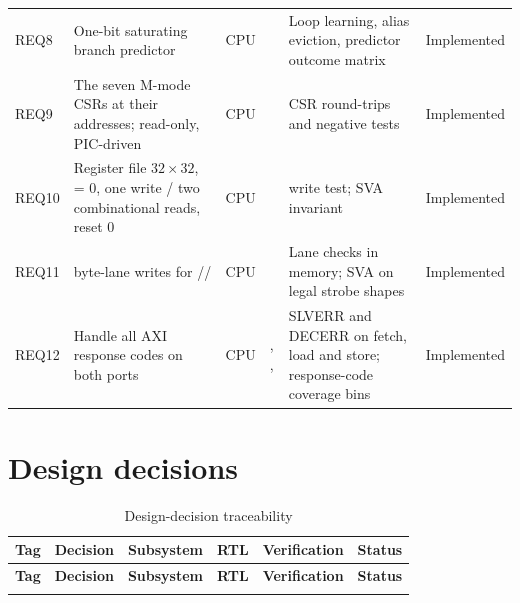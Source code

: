 \begin{landscape}
\begin{longtable}{@{}lL{58mm}lL{48mm}L{42mm}l@{}}
REQ8 & One-bit saturating branch predictor & CPU &
   & Loop learning, alias eviction, predictor outcome matrix & Implemented \\

REQ9 & The seven M-mode CSRs at their addresses;  read-only, PIC-driven & CPU &
   & CSR round-trips and negative tests & Implemented \\

REQ10 & Register file $32\times32$,  = 0, one write / two combinational reads, reset 0 & CPU &
   &  write test; SVA  invariant & Implemented \\

REQ11 &  byte-lane writes for // & CPU &
   & Lane checks in memory; SVA on legal strobe shapes & Implemented \\

REQ12 & Handle all AXI response codes on both ports & CPU &
  , ,  & SLVERR and DECERR on fetch, load and store; response-code coverage bins & Implemented \\
\end{longtable}

\section{Design decisions}

\begin{longtable}{@{}lL{60mm}lL{44mm}L{40mm}l@{}}
\caption{Design-decision traceability}\label{tab:dtrace}\\
\toprule
\textbf{Tag} & \textbf{Decision} & \textbf{Subsystem} & \textbf{RTL} & \textbf{Verification} & \textbf{Status} \\
\midrule
\endfirsthead
\toprule
\textbf{Tag} & \textbf{Decision} & \textbf{Subsystem} & \textbf{RTL} & \textbf{Verification} & \textbf{Status} \\
\midrule
\endhead
\bottomrule
\endfoot


\end{longtable}
\end{landscape}
